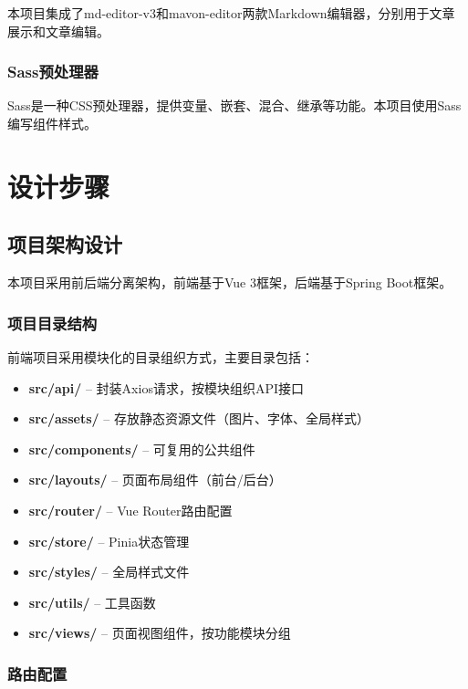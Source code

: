 \documentclass[12pt,a4paper]{article}
\begin{document}
本项目集成了md-editor-v3和mavon-editor两款Markdown编辑器，分别用于文章展示和文章编辑。

\subsubsection{Sass预处理器}

Sass是一种CSS预处理器，提供变量、嵌套、混合、继承等功能。本项目使用Sass编写组件样式。


\section{设计步骤}

\subsection{项目架构设计}

本项目采用前后端分离架构，前端基于Vue 3框架，后端基于Spring Boot框架。

\subsubsection{项目目录结构}

前端项目采用模块化的目录组织方式，主要目录包括：

\begin{itemize}[leftmargin=2em]
    \item \textbf{src/api/} -- 封装Axios请求，按模块组织API接口
    \item \textbf{src/assets/} -- 存放静态资源文件（图片、字体、全局样式）
    \item \textbf{src/components/} -- 可复用的公共组件
    \item \textbf{src/layouts/} -- 页面布局组件（前台/后台）
    \item \textbf{src/router/} -- Vue Router路由配置
    \item \textbf{src/store/} -- Pinia状态管理
    \item \textbf{src/styles/} -- 全局样式文件
    \item \textbf{src/utils/} -- 工具函数
    \item \textbf{src/views/} -- 页面视图组件，按功能模块分组
\end{itemize}

\subsubsection{路由配置}
\end{document}
